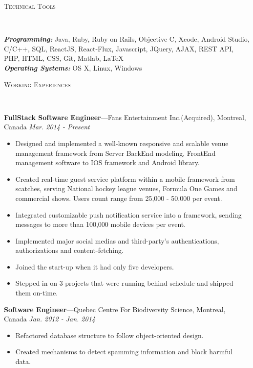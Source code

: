 \documentclass[11pt]{article}
\newenvironment{changemargin}[2]{%
  \begin{list}{}{%
    \setlength{\topsep}{0pt}%
    \setlength{\leftmargin}{#1}%
    \setlength{\rightmargin}{#2}%
    \setlength{\listparindent}{\parindent}%
    \setlength{\itemindent}{\parindent}%
    \setlength{\parsep}{\parskip}%
  }%
  \item[]}{\end{list}
}
\newcommand{\lineover}{
	\begin{changemargin}{-0.05in}{-0.05in}
		\vspace*{-8pt}
		\hrulefill \\
		\vspace*{-2pt}
	\end{changemargin}
}
\newcommand{\header}[1]{
	\begin{changemargin}{-0.5in}{-0.5in}
		\scshape{#1}\\
  	\lineover
	\end{changemargin}
}
\newenvironment{body} {
	\vspace*{-16pt}
	\begin{changemargin}{-0.25in}{-0.5in}
  }	
	{\end{changemargin}
}
\begin{document}
\header{Technical Tools}
\begin{body}
	\vspace{14pt}
	\emph{\textbf{Programming:}}{} Java, Ruby, Ruby on Rails, Objective C, Xcode, Android Studio, C/C++, SQL, ReactJS, React-Flux, Javascript, JQuery, AJAX, REST API, PHP, HTML, CSS, Git, Matlab, \LaTeX\\
\medskip
	\emph{\textbf{Operating Systems:}}{} OS X, Linux, Windows\\
\end{body}
\smallskip
\header{Working Experiences}
\begin{body}
	\vspace{14pt}
	\textbf{FullStack Software Engineer}---Fans Entertainment Inc.(Acquired), Montreal, Canada  \hfill \emph{Mar. 2014 - Present}\\
	\begin{itemize} \itemsep -0pt  %
		\item Designed and implemented a well-known responsive and scalable venue management framework from Server BackEnd modeling, FrontEnd management software to IOS framework and Android library.
		\item Created real-time guest service platform within a mobile framework from scatches, serving National hockey league venues, Formula One Games and commercial shows. Users count range from 25,000 - 50,000 per event.
		\item Integrated customizable push notification service into a framework, sending messages to more than 100,000 mobile devices per event.
		\item Implemented major social medias and third-party's authentications, authorizations and content-fetching.
		\item Joined the start-up when it had only five developers.
		\item Stepped in on 3 projects that were running behind schedule and shipped them on-time.
	\end{itemize}

	\textbf{Software Engineer}---Quebec Centre For Biodiversity Science, Montreal, Canada  \hfill \emph{Jan. 2012 - Jan. 2014}\\
	\begin{itemize} \itemsep -0pt  %
		\item Refactored database structure to follow object-oriented design.
		\item Created mechanisms to detect spamming information and block harmful data.
	\end{itemize}	
	

\end{body}
\end{document}

